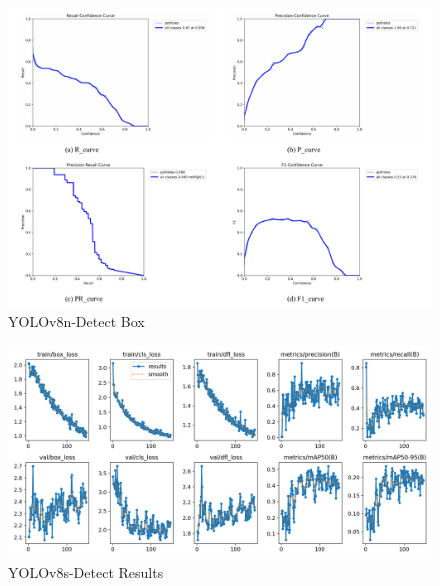 \documentclass{MathorCupmodeling}
\begin{document}
\begin{figure}[H]
	\centering
	\includegraphics[scale=0.48]{Figures/detect/Detect.pdf}
	\caption{YOLOv8n-Detect Box}
	\label{fig:YOLOv8n-Detect-Box}
\end{figure}
\begin{figure}[H]
	\centering
	\includegraphics[scale=0.5]{Figures/detect/DetectResults.png}
	\caption{YOLOv8s-Detect Results}
	\label{fig:YOLOv8s-Detect-Results}
\end{figure}
\end{document}
